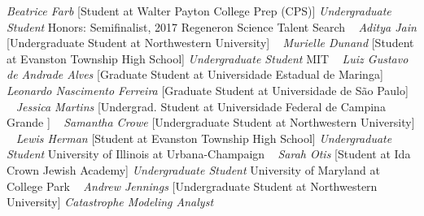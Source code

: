 \GapNoBreak
{}
\textit{Beatrice Farb}
    [Student at Walter Payton College Prep (CPS)]
\newline
    \textit{Undergraduate Student}
    \newline
    {\footnotesize Honors: Semifinalist, 2017 Regeneron Science Talent Search}
    \newline
~
\Gap{}
\textit{Aditya Jain}
    [Undergraduate Student at Northwestern University]
\newline
~
\Gap{}
\textit{Murielle Dunand}
    [Student at Evanston Township High School]
\newline
    \textit{Undergraduate Student}
    \newline
    MIT
    \newline
~
\Gap{}
\textit{Luiz Gustavo de Andrade Alves}
    [Graduate Student at Universidade Estadual de Maringa]
\newline
~
\Gap{}
\textit{Leonardo Nascimento Ferreira}
    [Graduate Student at Universidade de S\~ao Paulo]
\newline
~
\Gap{}
\textit{Jessica Martins}
    [Undergrad. Student at Universidade Federal de Campina Grande ]
\newline
~
\Gap{}
\textit{Samantha Crowe}
    [Undergraduate Student at Northwestern University]
\newline
~
\Gap{}
\textit{Lewis Herman}
    [Student at Evanston Township High School]
\newline
    \textit{Undergraduate Student}
    \newline
    University of Illinois at Urbana-Champaign
    \newline
~
\Gap{}
\textit{Sarah Otis}
    [Student at Ida Crown Jewish Academy]
\newline
    \textit{Undergraduate Student}
    \newline
    University of Maryland at College Park
    \newline
~
\Gap{}
\textit{Andrew Jennings}
    [Undergraduate Student at Northwestern University]
\newline
    \textit{Catastrophe Modeling Analyst}
    \newline
